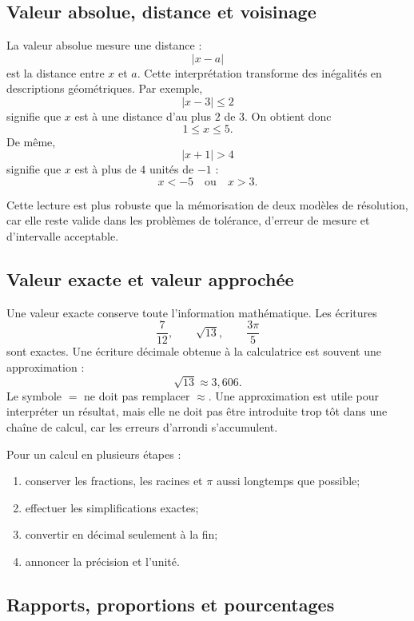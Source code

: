 \documentclass[12pt,a4paper,openany]{book}
\newcommand{\abs}[1]{\left\lvert #1\right\rvert}
\begin{document}
\subsection{Valeur absolue, distance et voisinage}

La valeur absolue mesure une distance :
\[
\abs{x-a}
\]
est la distance entre $x$ et $a$. Cette interprétation transforme des inégalités en descriptions géométriques. Par exemple,
\[
\abs{x-3}\leq2
\]
signifie que $x$ est à une distance d'au plus $2$ de $3$. On obtient donc
\[
1\leq x\leq5.
\]
De même,
\[
\abs{x+1}>4
\]
signifie que $x$ est à plus de $4$ unités de $-1$ :
\[
x<-5\quad\text{ou}\quad x>3.
\]

Cette lecture est plus robuste que la mémorisation de deux modèles de résolution, car elle reste valide dans les problèmes de tolérance, d'erreur de mesure et d'intervalle acceptable.

\subsection{Valeur exacte et valeur approchée}

Une valeur exacte conserve toute l'information mathématique. Les écritures
\[
\frac{7}{12},\qquad \sqrt{13},\qquad \frac{3\pi}{5}
\]
sont exactes. Une écriture décimale obtenue à la calculatrice est souvent une approximation :
\[
\sqrt{13}\approx3{,}606.
\]
Le symbole $=$ ne doit pas remplacer $\approx$. Une approximation est utile pour interpréter un résultat, mais elle ne doit pas être introduite trop tôt dans une chaîne de calcul, car les erreurs d'arrondi s'accumulent.

\begin{methodbox}
Pour un calcul en plusieurs étapes :
\begin{enumerate}
\item conserver les fractions, les racines et $\pi$ aussi longtemps que possible;
\item effectuer les simplifications exactes;
\item convertir en décimal seulement à la fin;
\item annoncer la précision et l'unité.
\end{enumerate}
\end{methodbox}

\subsection{Rapports, proportions et pourcentages}
\end{document}
